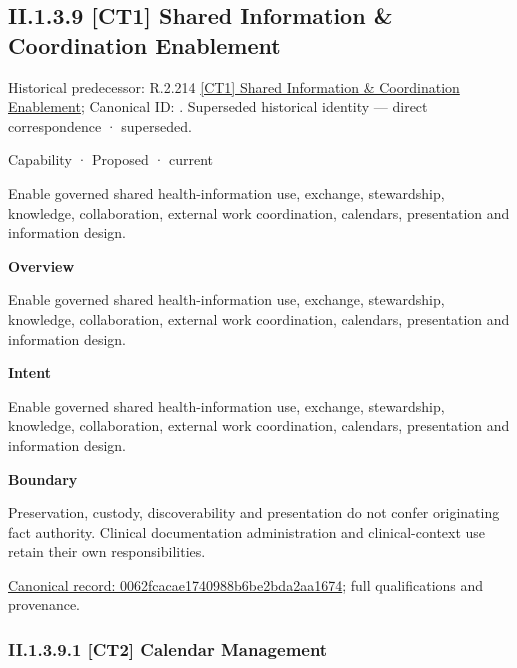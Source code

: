 \subsection*{II.1.3.9 [CT1] Shared Information \& Coordination Enablement}
\label{navigation:II.1.3.9}

{\small Historical predecessor: R.2.214 \hyperref[element:eeabb9c3c526404cbe4302906560fa7e]{[CT1] Shared Information \& Coordination Enablement}; Canonical ID: \texttt{}. Superseded historical identity — direct correspondence · superseded.}\par
\label{element:0062fcacae1740988b6be2bda2aa1674}
{\small Capability · Proposed · current}\par

Enable governed shared health-information use, exchange, stewardship, knowledge, collaboration, external work coordination, calendars, presentation and information design.



\textbf{Overview}



Enable governed shared health-information use, exchange, stewardship, knowledge, collaboration, external work coordination, calendars, presentation and information design.



\textbf{Intent}



Enable governed shared health-information use, exchange, stewardship, knowledge, collaboration, external work coordination, calendars, presentation and information design.



\textbf{Boundary}



Preservation, custody, discoverability and presentation do not confer originating fact authority. Clinical documentation administration and clinical-context use retain their own responsibilities.


{\footnotesize \href{../../../../../../../continuum/strategy/capability/0062fcacae1740988b6be2bda2aa1674.md}{Canonical record: 0062fcacae1740988b6be2bda2aa1674}; full qualifications and provenance.}\par
\subsubsection*{II.1.3.9.1 [CT2] Calendar Management}
\label{navigation:II.1.3.9.1}


